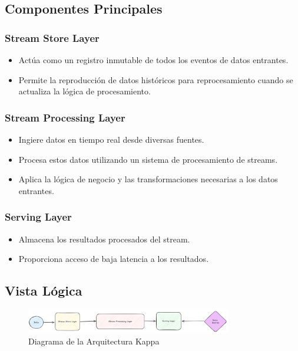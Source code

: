 \newpage
\subsection{Componentes Principales}

\subsubsection{Stream Store Layer}
\begin{itemize}
    \item Actúa como un registro inmutable de todos los eventos de datos entrantes.
    \item Permite la reproducción de datos históricos para reprocesamiento cuando se actualiza la lógica de procesamiento.
\end{itemize}

\subsubsection{Stream Processing Layer}
\begin{itemize}
    \item Ingiere datos en tiempo real desde diversas fuentes.
    \item Procesa estos datos utilizando un sistema de procesamiento de streams.
    \item Aplica la lógica de negocio y las transformaciones necesarias a los datos entrantes.
\end{itemize}

\subsubsection{Serving Layer}
\begin{itemize}
    \item Almacena los resultados procesados del stream.
    \item Proporciona acceso de baja latencia a los resultados.
\end{itemize}

\newpage
\subsection{Vista Lógica}
\begin{figure}[h]
\centering
\includegraphics[width=0.8\textwidth]{teorico/arquitecturas/kappa.png}
\caption{Diagrama de la Arquitectura Kappa}
\label{fig:arquitectura_kappa}
\end{figure}

